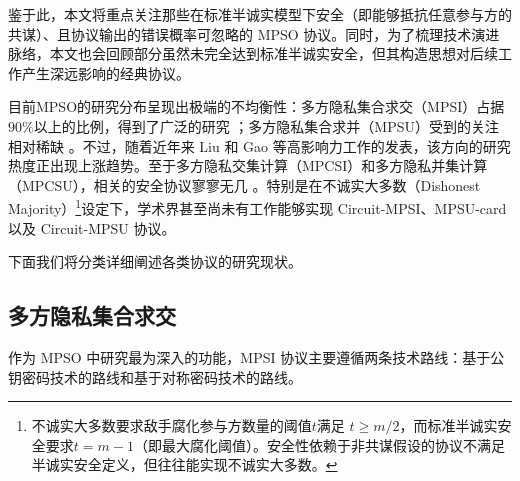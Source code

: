鉴于此，本文将重点关注那些在标准半诚实模型下安全（即能够抵抗任意参与方的共谋）、且协议输出的错误概率可忽略的 MPSO 协议。同时，为了梳理技术演进脉络，本文也会回顾部分虽然未完全达到标准半诚实安全，但其构造思想对后续工作产生深远影响的经典协议。

目前MPSO的研究分布呈现出极端的不均衡性：多方隐私集合求交（MPSI）占据$90\%$以上的比例，得到了广泛的研究 \cite{FreedmanNP04,KS-CRYPTO-2005,HazayV17,KMPRT-CCS-2017,InbarOP18,GPRTY-CRYPTO-2021,NTY-CCS-2021,BNOP-AsiaCCS-2022,WuYC24}；多方隐私集合求并（MPSU）受到的关注相对稀缺 \cite{KS-CRYPTO-2005,Frikken-ACNS-2007,GaoNT24}。不过，随着近年来 Liu 和 Gao \cite{LG-ASIACRYPT-2023} 等高影响力工作的发表，该方向的研究热度正出现上涨趋势。至于多方隐私交集计算（MPCSI）和多方隐私并集计算（MPCSU），相关的安全协议寥寥无几 \cite{KS-CRYPTO-2005,ChenDGB22,GiorgiLOV24}。特别是在不诚实大多数（Dishonest Majority）\footnote{不诚实大多数要求敌手腐化参与方数量的阈值$t$满足 $t \ge m/2$，而标准半诚实安全要求$t = m - 1$（即最大腐化阈值）。安全性依赖于非共谋假设的协议不满足半诚实安全定义，但往往能实现不诚实大多数。}设定下，学术界甚至尚未有工作能够实现 Circuit-MPSI、MPSU-card 以及 Circuit-MPSU 协议。

下面我们将分类详细阐述各类协议的研究现状。

\subsection{多方隐私集合求交}

作为 MPSO 中研究最为深入的功能，MPSI 协议主要遵循两条技术路线：基于公钥密码技术的路线和基于对称密码技术的路线。

